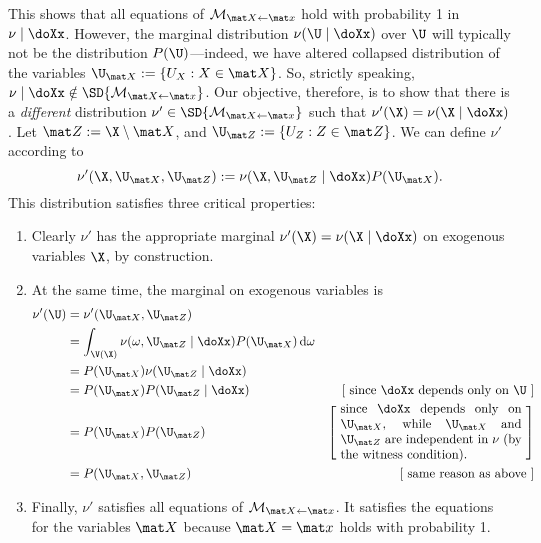 \begin{subappendices}
\begin{lproof}
    This shows that all equations of $\mathcal M_{\mat X {\gets}\mat x}$ hold with probability 1 in $\nu \mid \doXx$. However, the marginal distribution $\nu(\U \mid \doXx)$ over $\U$ will typically not be the distribution $P(\U)$---indeed, we have altered collapsed distribution of the variables $\U_{\mat X} := \{ U_X : X \in \mat X\}$. 
    So, strictly speaking, $\nu \mid \doXx \notin \SD{\mathcal M_{\mat X {\gets}\mat x}}$.
    Our objective, therefore, is to show that there is a \emph{different}  distribution $\nu' \in \SD{\mathcal M_{\mat X {\gets} \mat x}}$ such that $\nu'(\X) = \nu(\X \mid \doXx)$. 
    Let $\mat Z := \X \setminus \mat X$, and $\U_{\mat Z} := \{ U_Z : Z \in \mat Z\}$. 
    We can define $\nu'$ according to
    \[
        \nu'(\X, \U_{\mat X}, \U_{\mat Z}) := 
            \nu(\X, \U_{\mat Z} \mid \doXx) P(\U_{\mat X}).
    \]
    This distribution satisfies 
    three critical properties:
    \begin{enumerate}
        \item Clearly $\nu'$ has the appropriate marginal $\nu'(\X) = \nu(\X \mid \doXx)$ on exogenous variables $\X$, by construction.
        \item At the same time, the marginal on exogenous variables is
        \begin{align*}
            \nu'(\U) &= \nu'(\U_{\mat X}, \U_{\mat Z})  \\
            &= \int_{\V(\X)} \nu(\omega, \U_{\mat Z}\mid \doXx) P(\U_{\mat X}) \,\mathrm d\omega\\
            &= P(\U_{\mat X}) \nu(\U_{\mat Z} \mid \doXx) 
                &\text{}\\
            &= P(\U_{\mat X}) P(\U_{\mat Z} \mid \doXx) 
                &\text{[ since $\doXx$ depends only on $\U$ ]}
                \\
            &= P(\U_{\mat X}) P(\U_{\mat Z}) 
                &\left[~\parbox{5cm}{ since $\doXx$ depends only on $\U_{\mat X}$, while $\U_{\mat X}$ and $\U_{\mat Z}$ are independent in $\nu$ (by the witness condition).}~\right]
                \\
            &= P(\U_{\mat X}, \U_{\mat Z})
                & [\text{  same reason as above }]
        \end{align*}
        \item Finally, $\nu'$ satisfies all equations of $\mathcal M_{\mat X{\gets} \mat x}$. It satisfies the equations for the variables $\mat X$ because $\mat X = \mat x$ holds with probability 1. 

\end{enumerate}
\end{lproof}
\end{subappendices}
